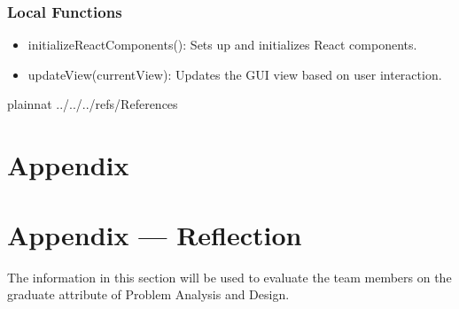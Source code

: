 \documentclass[12pt, titlepage]{article}
\begin{document}
\subsubsection{Local Functions}

\begin{itemize}
  \item initializeReactComponents(): Sets up and initializes React components.
  \item updateView(currentView): Updates the GUI view based on user interaction.
\end{itemize}

\newpage

 {plainnat}
 {../../../refs/References}

\newpage

\section{Appendix} \label{Appendix}


\newpage{}

\section*{Appendix --- Reflection}


The information in this section will be used to evaluate the team members on the
graduate attribute of Problem Analysis and Design.


\end{document}
